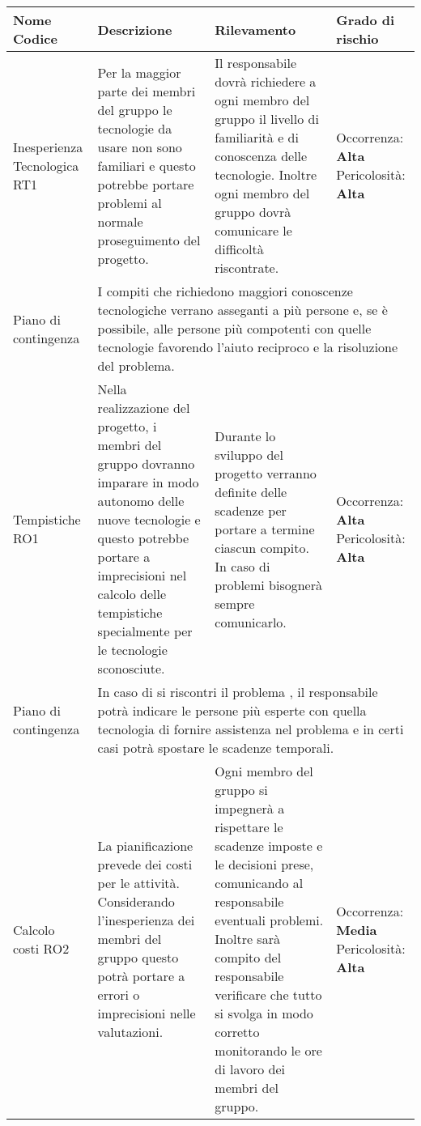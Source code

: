 \begin{center}
		\begin{longtable}{|p{}|p{}|p{}|p{}|}
			\hline
			\rowcolor{lighter-grayer}
				\centering\textbf{Nome Codice} & \textbf{Descrizione} & \textbf{Rilevamento} & 	\textbf{Grado di rischio} \\
			\hline
			\endfirsthead
		
		\hline
		\centering Inesperienza Tecnologica RT1& Per la maggior parte dei membri del gruppo le tecnologie da usare non sono familiari e questo potrebbe portare problemi al normale proseguimento del progetto.  & Il responsabile dovrà richiedere a ogni membro del gruppo il livello di familiarità e di conoscenza delle tecnologie. Inoltre ogni membro del gruppo dovrà comunicare le difficoltà riscontrate. & Occorrenza: \textbf{Alta} Pericolosità: \textbf{Alta}\\
		\hline
		\centering Piano di contingenza & \multicolumn{3}{p{0.83\textwidth}}{I compiti che richiedono maggiori conoscenze tecnologiche verrano asseganti a più persone e, se è possibile, alle persone più compotenti con quelle tecnologie favorendo l'aiuto reciproco e la risoluzione del problema.} \\
		\hline
		\centering Tempistiche RO1& Nella realizzazione del progetto, i membri del gruppo dovranno imparare in modo autonomo delle nuove tecnologie e questo potrebbe portare a imprecisioni nel calcolo delle tempistiche specialmente per le tecnologie sconosciute. & Durante lo sviluppo del progetto verranno definite delle scadenze per portare a termine ciascun compito. In caso di problemi bisognerà sempre comunicarlo. & Occorrenza: \textbf{Alta} Pericolosità: \textbf{Alta}\\
		\hline
		\centering Piano di contingenza & \multicolumn{3}{p{0.83\textwidth}}{In caso di si riscontri il problema , il responsabile potrà indicare le persone più esperte con quella tecnologia di fornire assistenza nel problema e in certi casi potrà spostare le scadenze temporali.} \\
		\hline
		\centering Calcolo costi RO2& La pianificazione prevede dei costi per le attività. Considerando l'inesperienza dei membri del gruppo questo potrà portare a errori o imprecisioni nelle valutazioni. & Ogni membro del gruppo si impegnerà a rispettare le scadenze imposte e le decisioni prese, comunicando al responsabile eventuali problemi. Inoltre sarà compito del responsabile verificare che tutto si svolga in modo corretto monitorando le ore di lavoro dei membri del gruppo. & Occorrenza: \textbf{Media} Pericolosità: \textbf{Alta}\\

\end{longtable}
\end{center}
